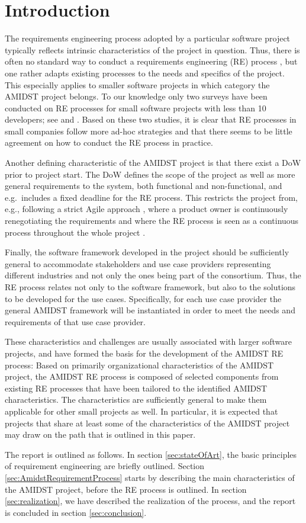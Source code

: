 \section{Introduction}

The requirements engineering process adopted by a particular software project typically reflects intrinsic
characteristics of the project in question. Thus, there is often no standard way to conduct a requirements engineering
(RE) process \cite{Poh10}, but one rather adapts existing processes to the needs and specifics of the project. This
especially applies to smaller software projects in which category the AMIDST project belongs. To our
knowledge only two surveys have been conducted on RE processes for small software projects with less than 10 developers;
see \cite{Qui10} and \cite{Ara07}.  Based on these two studies, it is clear that RE processes in small companies follow
more ad-hoc strategies and that there seems to be little agreement on how to conduct the RE process in practice. 
 
Another defining characteristic of the AMIDST project is that there exist a DoW prior to project start.  The DoW defines the scope of the project as well as more general requirements to the system, both functional and non-functional, and e.g.\ includes a fixed deadline for the RE process. This restricts the project from, e.g., following a strict Agile approach
\cite{Din10}, where a product owner is continuously renegotiating the requirements and where the RE process is seen as a
continuous process throughout the whole project \cite{Kav11}.

Finally, the software framework developed in the project should be sufficiently general to accommodate stakeholders and
use case providers representing different industries and not only the ones being part of the consortium. Thus, the RE
process relates not only to the software framework, but also to the solutions to be developed for the use
cases. Specifically, for each use case provider the general AMIDST framework will be instantiated in order to meet the
needs and requirements of that use case provider.    

These characteristics and challenges are usually associated with larger software projects, and have  formed
the basis for the development of the AMIDST RE process: Based on primarily organizational characteristics of the AMIDST
project, the AMIDST RE process is composed of selected components from existing RE processes that have been tailored to the identified AMIDST characteristics. The characteristics are sufficiently general to make them
applicable for other small projects as well.  In particular, it is expected that projects that share at least some of the characteristics of the AMIDST project may draw on the path that is outlined in this paper.

The report is outlined as follows.  In section \ref{sec:stateOfArt}, the basic principles of requirement engineering are
briefly outlined.  Section \ref{sec:AmidstRequirementProcess} starts by describing the main characteristics of the
AMIDST project, before the RE process is outlined.  In section \ref{sec:realization}, we have described the realization
of the process, and the report is concluded in section \ref{sec:conclusion}. 
